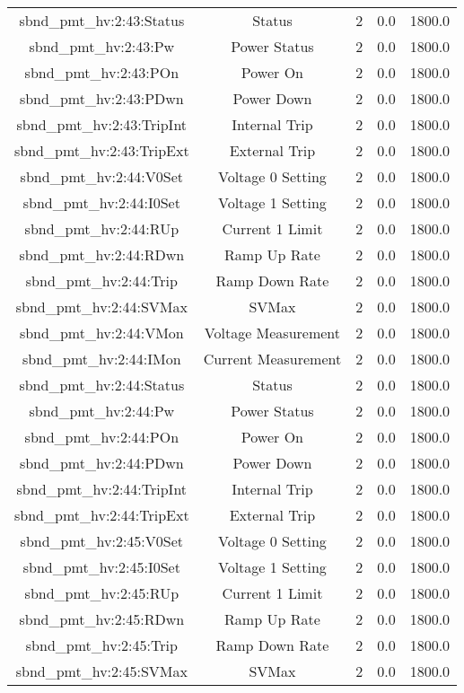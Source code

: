 \begin{center}
\begin{longtable}{c | c c c c }
sbnd\_pmt\_hv:2:43:Status & Status & 2 & 0.0 & 1800.0\\ 
sbnd\_pmt\_hv:2:43:Pw & Power Status & 2 & 0.0 & 1800.0\\ 
sbnd\_pmt\_hv:2:43:POn & Power On & 2 & 0.0 & 1800.0\\ 
sbnd\_pmt\_hv:2:43:PDwn & Power Down & 2 & 0.0 & 1800.0\\ 
sbnd\_pmt\_hv:2:43:TripInt & Internal Trip & 2 & 0.0 & 1800.0\\ 
sbnd\_pmt\_hv:2:43:TripExt & External Trip & 2 & 0.0 & 1800.0\\ 
sbnd\_pmt\_hv:2:44:V0Set & Voltage 0 Setting & 2 & 0.0 & 1800.0\\ 
sbnd\_pmt\_hv:2:44:I0Set & Voltage 1 Setting & 2 & 0.0 & 1800.0\\ 
sbnd\_pmt\_hv:2:44:RUp & Current 1 Limit & 2 & 0.0 & 1800.0\\ 
sbnd\_pmt\_hv:2:44:RDwn & Ramp Up Rate & 2 & 0.0 & 1800.0\\ 
sbnd\_pmt\_hv:2:44:Trip & Ramp Down Rate & 2 & 0.0 & 1800.0\\ 
sbnd\_pmt\_hv:2:44:SVMax & SVMax & 2 & 0.0 & 1800.0\\ 
sbnd\_pmt\_hv:2:44:VMon & Voltage Measurement & 2 & 0.0 & 1800.0\\ 
sbnd\_pmt\_hv:2:44:IMon & Current Measurement & 2 & 0.0 & 1800.0\\ 
sbnd\_pmt\_hv:2:44:Status & Status & 2 & 0.0 & 1800.0\\ 
sbnd\_pmt\_hv:2:44:Pw & Power Status & 2 & 0.0 & 1800.0\\ 
sbnd\_pmt\_hv:2:44:POn & Power On & 2 & 0.0 & 1800.0\\ 
sbnd\_pmt\_hv:2:44:PDwn & Power Down & 2 & 0.0 & 1800.0\\ 
sbnd\_pmt\_hv:2:44:TripInt & Internal Trip & 2 & 0.0 & 1800.0\\ 
sbnd\_pmt\_hv:2:44:TripExt & External Trip & 2 & 0.0 & 1800.0\\ 
sbnd\_pmt\_hv:2:45:V0Set & Voltage 0 Setting & 2 & 0.0 & 1800.0\\ 
sbnd\_pmt\_hv:2:45:I0Set & Voltage 1 Setting & 2 & 0.0 & 1800.0\\ 
sbnd\_pmt\_hv:2:45:RUp & Current 1 Limit & 2 & 0.0 & 1800.0\\ 
sbnd\_pmt\_hv:2:45:RDwn & Ramp Up Rate & 2 & 0.0 & 1800.0\\ 
sbnd\_pmt\_hv:2:45:Trip & Ramp Down Rate & 2 & 0.0 & 1800.0\\ 
sbnd\_pmt\_hv:2:45:SVMax & SVMax & 2 & 0.0 & 1800.0\\ 

\end{longtable}
\end{center}

